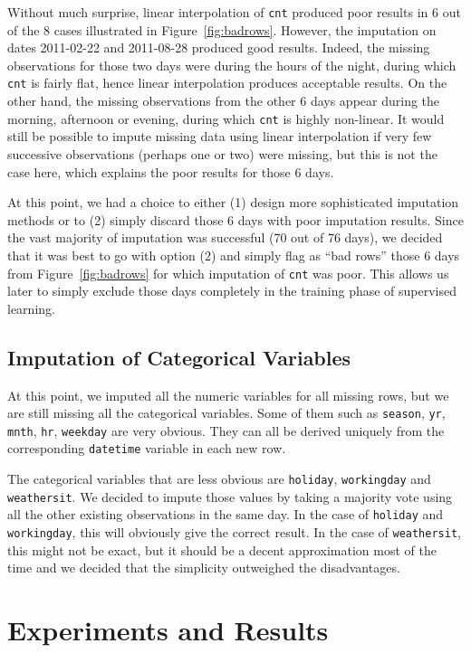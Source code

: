 \documentclass[12pt]{article}
\begin{document}
Without much surprise, linear interpolation of \texttt{cnt} produced poor results in 6 out of the 8 cases illustrated in Figure~\ref{fig:badrows}. However, the imputation on dates 2011-02-22 and 2011-08-28 produced good results. Indeed, the missing observations for those two days were during the hours of the night, during which \texttt{cnt} is fairly flat, hence linear interpolation produces acceptable results. On the other hand, the missing observations from the other 6 days appear during the morning, afternoon or evening, during which \texttt{cnt} is highly non-linear. It would still be possible to impute missing data using linear interpolation if very few successive observations (perhaps one or two) were missing, but this is not the case here, which explains the poor results for those 6 days.

At this point, we had a choice to either (1) design more sophisticated imputation methods or to (2) simply discard those 6 days with poor imputation results. Since the vast majority of imputation was successful (70 out of 76 days), we decided that it was best to go with option (2) and simply flag as ``bad rows'' those 6 days from Figure~\ref{fig:badrows} for which imputation of \texttt{cnt} was poor. This allows us later to simply exclude those days completely in the training phase of supervised learning.

\subsection{Imputation of Categorical Variables}

At this point, we imputed all the numeric variables for all missing rows, but we are still missing all the categorical variables. Some of them such as \texttt{season}, \texttt{yr}, \texttt{mnth}, \texttt{hr}, \texttt{weekday} are very obvious. They can all be derived uniquely from the corresponding \texttt{datetime} variable in each new row.

The categorical variables that are less obvious are \texttt{holiday}, \texttt{workingday} and \texttt{weathersit}. We decided to impute those values by taking a majority vote using all the other existing observations in the same day. In the case of \texttt{holiday} and \texttt{workingday}, this will obviously give the correct result. In the case of \texttt{weathersit}, this might not be exact, but it should be a decent approximation most of the time and we decided that the simplicity outweighed the disadvantages.

\section{Experiments and Results}
\label{sec:experiments-and-results}
\end{document}
